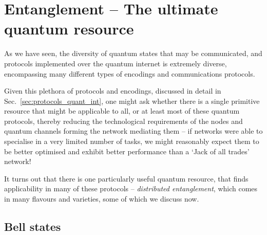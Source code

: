 %
%

\section{Entanglement -- The ultimate quantum resource} \label{sec:ent_ultimate} 

As we have seen, the diversity of quantum states that may be communicated, and protocols implemented over the quantum internet is extremely diverse, encompassing many different types of encodings and communications protocols.

Given this plethora of protocols and encodings, discussed in detail in Sec.~\ref{sec:protocols_quant_int}, one might ask whether there is a single primitive resource that might be applicable to all, or at least most of these quantum protocols, thereby reducing the technological requirements of the nodes and quantum channels forming the network mediating them -- if networks were able to specialise in a very limited number of tasks, we might reasonably expect them to be better optimised and exhibit better performance than a `Jack of all trades' network!

It turns out that there is one particularly useful quantum resource, that finds applicability in many of these protocols -- \textit{distributed entanglement}, which comes in many flavours and varieties, some of which we discuss now.

%
%

\subsection{Bell states}

